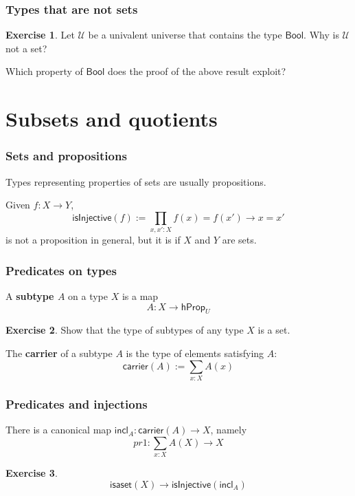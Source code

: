 \documentclass{beamer}
\newcommand{\fat}[1]{\textbf{#1}}
\newcommand{\constfont}[1]{\ensuremath{\mathsf{#1}}}
\newcommand{\U}{\mathcal{U}}
\newcommand{\Bool}{\constfont{Bool}}
\newcommand{\hProp}{\constfont{hProp}}
\newcommand{\isaset}{\constfont{isaset}}
\newcommand{\carrier}{\constfont{carrier}}
\newcommand{\incl}{\constfont{incl}}
\newcommand{\isInjective}{\constfont{isInjective}}
\theoremstyle{definition}
\newtheorem{exercise}{Exercise}
\begin{document}
\begin{frame}
 \frametitle{Types that are \fat{not} sets}

  \begin{exercise}
     Let $\U$ be a univalent universe that contains the type $\Bool$.
     Why is $\U$ not a set?
  \end{exercise}

  Which property of $\Bool$ does the proof of the above result exploit?

\end{frame}

\section{Subsets and quotients}

\begin{frame}
 \frametitle{Sets and propositions}

 Types representing properties of sets are usually propositions. \pause

 \begin{example}
   Given $f : X \to Y$,
   \[   \constfont{isInjective}(f) := \prod_{x, x' : X} f(x) = f(x') \to x = x' \]
   is not a proposition in general, but it is if $X$ and $Y$ are sets.
 \end{example}
\end{frame}

\begin{frame}
 \frametitle{Predicates on types}

    A \fat{subtype $A$} on a type $X$ is a map
    \[ A : X \to \hProp_U \]
  \begin{exercise}
   Show that the type of subtypes of any type $X$ is a set.
  \end{exercise}
  \pause
  The \fat{carrier} of a subtype $A$ is the type of elements satisfying $A$:
  \[ \carrier(A) := \sum_{x:X}A(x) \]
\end{frame}

\begin{frame}
 \frametitle{Predicates and injections}

 There is a canonical map $\incl_A:\carrier(A)\to{}X$\pause, namely
 \[pr1:\sum_{x:X}A(X)\to{}X\]

 \begin{exercise}
   \[\isaset(X)\to\isInjective(\incl_A)\]
 \end{exercise}
\end{frame}
\end{document}
